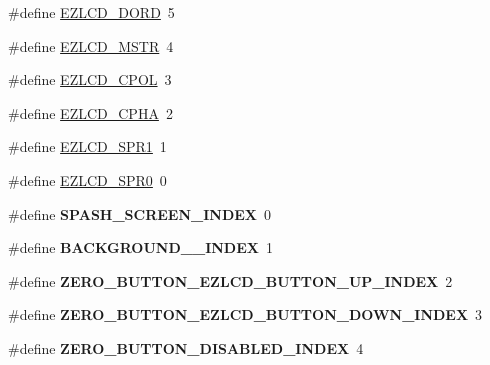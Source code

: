\begin{DoxyCompactItemize}
\item 
\#define \hyperlink{group__ez_l_c_d__103__user__config_ga0001e83f90daec4f19fde73532af43d0}{E\-Z\-L\-C\-D\-\_\-\-D\-O\-R\-D}~5
\item 
\#define \hyperlink{group__ez_l_c_d__103__user__config_gab4f6c4fe9fb91004a29df47a5cfcb723}{E\-Z\-L\-C\-D\-\_\-\-M\-S\-T\-R}~4
\item 
\#define \hyperlink{group__ez_l_c_d__103__user__config_gafae739752ee0d5822b4a3e3d48bc1a1f}{E\-Z\-L\-C\-D\-\_\-\-C\-P\-O\-L}~3
\item 
\#define \hyperlink{group__ez_l_c_d__103__user__config_ga5317237df9ba416ecac5e89e5bbd4092}{E\-Z\-L\-C\-D\-\_\-\-C\-P\-H\-A}~2
\item 
\#define \hyperlink{group__ez_l_c_d__103__user__config_gae9a52aea26ed6ba9564bccad0effcbae}{E\-Z\-L\-C\-D\-\_\-\-S\-P\-R1}~1
\item 
\#define \hyperlink{group__ez_l_c_d__103__user__config_ga51b807c704bcc640ddecf99866ca4d72}{E\-Z\-L\-C\-D\-\_\-\-S\-P\-R0}~0
\item 
\hypertarget{group__ez_l_c_d__103__user__config_ga89a2ac1ae95cdb4166d23f28383d18c0}{\#define {\bfseries S\-P\-A\-S\-H\-\_\-\-S\-C\-R\-E\-E\-N\-\_\-\-I\-N\-D\-E\-X}~0}\label{group__ez_l_c_d__103__user__config_ga89a2ac1ae95cdb4166d23f28383d18c0}

\item 
\hypertarget{group__ez_l_c_d__103__user__config_ga0ad5bb1bbdf4b9cc60856fba3a9e53bd}{\#define {\bfseries B\-A\-C\-K\-G\-R\-O\-U\-N\-D\-\_\-\_\-\-I\-N\-D\-E\-X}~1}\label{group__ez_l_c_d__103__user__config_ga0ad5bb1bbdf4b9cc60856fba3a9e53bd}

\item 
\hypertarget{group__ez_l_c_d__103__user__config_ga76b9f38fb8c306443de2da6b2b79ab14}{\#define {\bfseries Z\-E\-R\-O\-\_\-\-B\-U\-T\-T\-O\-N\-\_\-\-E\-Z\-L\-C\-D\-\_\-\-B\-U\-T\-T\-O\-N\-\_\-\-U\-P\-\_\-\-I\-N\-D\-E\-X}~2}\label{group__ez_l_c_d__103__user__config_ga76b9f38fb8c306443de2da6b2b79ab14}

\item 
\hypertarget{group__ez_l_c_d__103__user__config_ga0bbe196e8f50af364f84fa5170cae0b7}{\#define {\bfseries Z\-E\-R\-O\-\_\-\-B\-U\-T\-T\-O\-N\-\_\-\-E\-Z\-L\-C\-D\-\_\-\-B\-U\-T\-T\-O\-N\-\_\-\-D\-O\-W\-N\-\_\-\-I\-N\-D\-E\-X}~3}\label{group__ez_l_c_d__103__user__config_ga0bbe196e8f50af364f84fa5170cae0b7}

\item 
\hypertarget{group__ez_l_c_d__103__user__config_gaa7651ebcee91fa6bbc5415eff147f170}{\#define {\bfseries Z\-E\-R\-O\-\_\-\-B\-U\-T\-T\-O\-N\-\_\-\-D\-I\-S\-A\-B\-L\-E\-D\-\_\-\-I\-N\-D\-E\-X}~4}\label{group__ez_l_c_d__103__user__config_gaa7651ebcee91fa6bbc5415eff147f170}


\end{DoxyCompactItemize}
